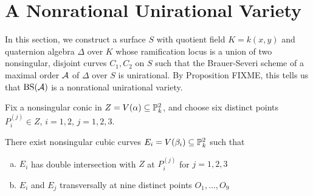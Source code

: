 \section{A Nonrational Unirational Variety}
In this section, we construct a surface $S$ with quotient field $K = k(x,y)$ and quaternion algebra $\Delta$ over $K$ whose ramification locus is a union of two nonsingular, disjoint curves $C_1,C_2$ on $S$ such that the Brauer-Severi scheme of a maximal order $\mathcal{A}$ of $\Delta$ over $S$ is unirational.  By Proposition FIXME, this tells us that $\textnormal{BS}(\mathcal{A})$ is a nonrational unirational variety.

Fix a nonsingular conic in $Z = V(\alpha)\subseteq \mathbb{P}^2_k$, and choose six distinct points $P_i^{(j)}\in Z$, $i=1,2$, $j=1,2,3$.
\begin{lem}
There exist nonsingular cubic curves $E_i = V(\beta_i) \subseteq \mathbb{P}^2_k$ such that
\begin{enumerate}[(a)]
\item  $E_i$ has double intersection with $Z$ at $P_i^{(j)}$ for $j=1,2,3$
\item  $E_i$ and $E_j$ transversally at nine distinct points $O_1,\dots,O_9$
\end{enumerate}
\end{lem}
